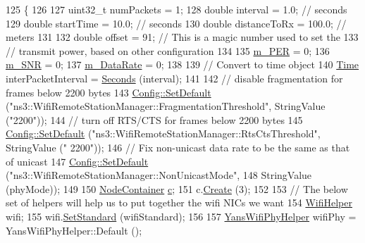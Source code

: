 \begin{DoxyCode}
125 \{
126 
127   uint32\_t numPackets = 1;
128   \textcolor{keywordtype}{double} interval = 1.0; \textcolor{comment}{// seconds}
129   \textcolor{keywordtype}{double} startTime = 10.0; \textcolor{comment}{// seconds}
130   \textcolor{keywordtype}{double} distanceToRx = 100.0; \textcolor{comment}{// meters}
131 
132   \textcolor{keywordtype}{double} offset = 91;  \textcolor{comment}{// This is a magic number used to set the }
133   \textcolor{comment}{// transmit power, based on other configuration}
134 
135   \hyperlink{classWifiInterferenceTestCase_ab810c2782277c76c886528e0b9d20537}{m\_PER} = 0;
136   \hyperlink{classWifiInterferenceTestCase_aebf7a181c7f73dd03a90b12e84ecd916}{m\_SNR} = 0;
137   \hyperlink{classWifiInterferenceTestCase_a3358f7dc0f18f41a5e9a5a2882be8078}{m\_DataRate} = 0;
138 
139   \textcolor{comment}{// Convert to time object}
140   \hyperlink{classns3_1_1Time}{Time} interPacketInterval = \hyperlink{group__timecivil_ga33c34b816f8ff6628e33d5c8e9713b9e}{Seconds} (interval);
141 
142   \textcolor{comment}{// disable fragmentation for frames below 2200 bytes}
143   \hyperlink{group__config_ga2e7882df849d8ba4aaad31c934c40c06}{Config::SetDefault} (\textcolor{stringliteral}{"ns3::WifiRemoteStationManager::FragmentationThreshold"}, 
      StringValue (\textcolor{stringliteral}{"2200"}));
144   \textcolor{comment}{// turn off RTS/CTS for frames below 2200 bytes}
145   \hyperlink{group__config_ga2e7882df849d8ba4aaad31c934c40c06}{Config::SetDefault} (\textcolor{stringliteral}{"ns3::WifiRemoteStationManager::RtsCtsThreshold"}, StringValue (\textcolor{stringliteral}{"
      2200"}));
146   \textcolor{comment}{// Fix non-unicast data rate to be the same as that of unicast}
147   \hyperlink{group__config_ga2e7882df849d8ba4aaad31c934c40c06}{Config::SetDefault} (\textcolor{stringliteral}{"ns3::WifiRemoteStationManager::NonUnicastMode"}, 
148                       StringValue (phyMode));
149 
150   \hyperlink{classns3_1_1NodeContainer}{NodeContainer} \hyperlink{lte_2model_2fading-traces_2fading__trace__generator_8m_ae0323a9039add2978bf5b49550572c7c}{c};
151   c.\hyperlink{classns3_1_1NodeContainer_a787f059e2813e8b951cc6914d11dfe69}{Create} (3);
152 
153   \textcolor{comment}{// The below set of helpers will help us to put together the wifi NICs we want}
154   \hyperlink{classns3_1_1WifiHelper}{WifiHelper} wifi;
155   wifi.\hyperlink{classns3_1_1WifiHelper_aa54f3e61527ef8de318d310045bc5dfd}{SetStandard} (wifiStandard);
156 
157   \hyperlink{classns3_1_1YansWifiPhyHelper}{YansWifiPhyHelper} wifiPhy =  YansWifiPhyHelper::Default ();

\end{DoxyCode}
